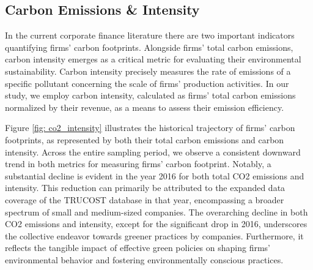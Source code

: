 \documentclass[12pt]{article}
\begin{document}
\subsection{Carbon Emissions \& Intensity}

In the current corporate finance literature there are two important indicators quantifying firms' carbon footprints. Alongside firms' total carbon emissions, carbon intensity emerges as a critical metric for evaluating their environmental sustainability. Carbon intensity precisely measures the rate of emissions of a specific pollutant concerning the scale of firms' production activities. In our study, we employ carbon intensity, calculated as firms' total carbon emissions normalized by their revenue, as a means to assess their emission efficiency.

Figure \ref{fig: co2_intensity} illustrates the historical trajectory of firms' carbon footprints, as represented by both their total carbon emissions and carbon intensity. Across the entire sampling period, we observe a consistent downward trend in both metrics for measuring firms' carbon footprint. Notably, a substantial decline is evident in the year 2016 for both total CO2 emissions and intensity. This reduction can primarily be attributed to the expanded data coverage of the TRUCOST database in that year, encompassing a broader spectrum of small and medium-sized companies. The overarching decline in both CO2 emissions and intensity, except for the significant drop in 2016, underscores the collective endeavor towards greener practices by companies. Furthermore, it reflects the tangible impact of effective green policies on shaping firms' environmental behavior and fostering environmentally conscious practices.
\end{document}
